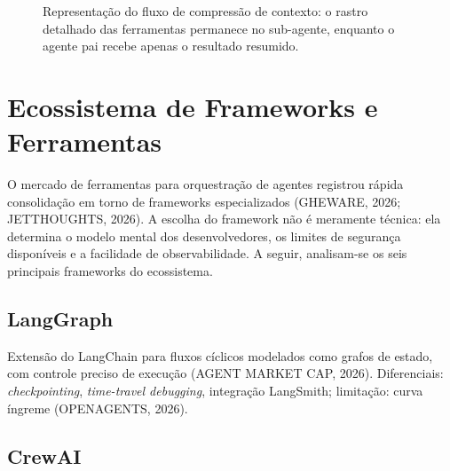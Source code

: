 \documentclass[12pt,a4paper]{article}
\begin{document}
\begin{figure}[htbp]
\centering
{}
\caption{Representação do fluxo de compressão de contexto: o rastro detalhado das ferramentas permanece no sub-agente, enquanto o agente pai recebe apenas o resultado resumido.}
\end{figure}


\section{Ecossistema de Frameworks e Ferramentas}

O mercado de ferramentas para orquestração de agentes registrou rápida consolidação em torno de frameworks especializados (GHEWARE, 2026; JETTHOUGHTS, 2026). A escolha do framework não é meramente técnica: ela determina o modelo mental dos desenvolvedores, os limites de segurança disponíveis e a facilidade de observabilidade. A seguir, analisam-se os seis principais frameworks do ecossistema.

\subsection{LangGraph}

Extensão do LangChain para fluxos cíclicos modelados como grafos de estado, com controle preciso de execução (AGENT MARKET CAP, 2026). Diferenciais: \textit{checkpointing}, \textit{time-travel debugging}, integração LangSmith; limitação: curva íngreme (OPENAGENTS, 2026).

\subsection{CrewAI}
\end{document}
